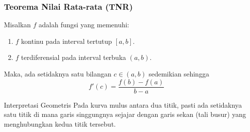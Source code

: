 \documentclass{../../kalkulus-ppt}
\begin{document}
\begin{frame}
  \frametitle{Teorema Nilai Rata-rata (TNR)}
  \begin{teorema}
    Misalkan $f$ adalah fungsi yang memenuhi:
    \begin{enumerate}
      \item $f$ kontinu pada interval tertutup $[a,b]$.
      \item $f$ terdiferensial pada interval terbuka $(a,b)$.
    \end{enumerate}
    Maka, ada setidaknya satu bilangan $c \in (a,b)$ sedemikian sehingga
    \[ f'(c) = \frac{f(b) - f(a)}{b - a} \]
  \end{teorema}
  \pause
  \begin{block}{Interpretasi Geometris}
    Pada kurva mulus antara dua titik, pasti ada setidaknya satu titik di mana garis singgungnya sejajar dengan garis sekan (tali busur) yang menghubungkan kedua titik tersebut.
  \end{block}
  \begin{center}
  \end{center}
\end{frame}
\end{document}
